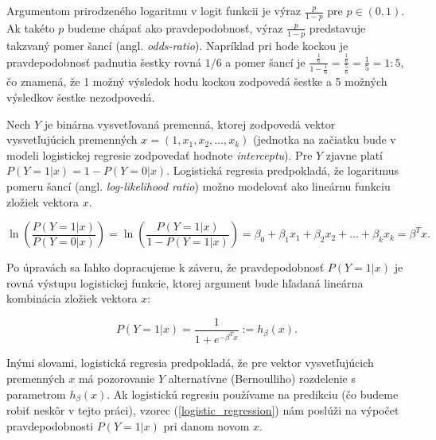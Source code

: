 \begin{center}
\end{center}

Argumentom prirodzeného logaritmu v logit funkcii je výraz \( \frac{p}{1 - p} \) pre \( p \in (0, 1) \).
Ak takéto \(p\) budeme chápať ako pravdepodobnosť, výraz \( \frac{p}{1 - p} \) predstavuje takzvaný pomer šancí (angl. \emph{odds-ratio}).
Napríklad pri hode kockou je pravdepodobnosť padnutia šestky rovná \( 1/6 \) a pomer šancí je \( \frac{\frac{1}{6}}{1 - \frac{1}{6}} = \frac{\frac{1}{6}}{\frac{5}{6}} = \frac{1}{5} = 1 : 5\),
čo znamená, že 1 možný výsledok hodu kockou zodpovedá šestke a 5 možných výsledkov šestke nezodpovedá.

Nech \( Y \) je binárna vysvetľovaná premenná, ktorej zodpovedá vektor vysvetľujúcich premenných \( x = (1, x_1, x_2, \ldots, x_k) \)
(jednotka na začiatku bude v modeli logistickej regresie zodpovedať hodnote \emph{interceptu}).
Pre \( Y \) zjavne platí \( P(Y = 1|x) = 1 - P(Y = 0|x) \).
Logistická regresia predpokladá, že logaritmus pomeru šancí (angl. \emph{log-likelihood ratio}) možno modelovať ako lineárnu funkciu zložiek vektora \( x \).

\[
\ln \left( \frac{P(Y = 1|x)}{P(Y = 0|x)} \right) = \ln \left( \frac{P(Y = 1|x)}{1 - P(Y = 1|x)} \right) = \beta_0 + \beta_1 x_1 + \beta_2 x_2 + \ldots + \beta_k x_k = \beta^T x.
\]

Po úpravách sa ľahko dopracujeme k záveru, že pravdepodobnosť \( P(Y = 1|x) \) je rovná výstupu logistickej funkcie, ktorej argument bude hľadaná lineárna kombinácia zložiek vektora \( x \):

\begin{equation} \label{logistic_regression}
P(Y = 1|x) = \frac{1}{1 + e^{-\beta^T x}} := h_\beta(x).
\end{equation}

Inými slovami, logistická regresia predpokladá, že pre vektor vysvetľujúcich premenných \(x\) má pozorovanie \(Y\)
alternatívne (Bernoulliho) rozdelenie s parametrom \(h_\beta(x)\).
Ak logistickú regresiu používame na predikciu (čo budeme robiť neskôr v tejto práci),
vzorec (\ref{logistic_regression}) nám poslúži na výpočet pravdepodobnosti \( P(Y = 1|x) \) pri danom novom \( x \).

